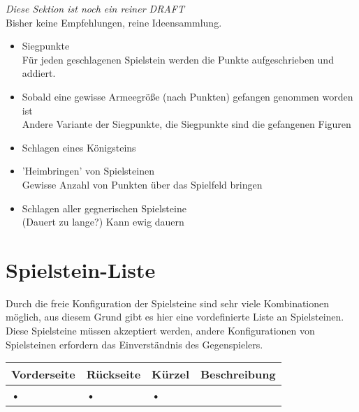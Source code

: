 \documentclass{article}
\begin{document}
	\textit{Diese Sektion ist noch ein reiner DRAFT} \\
	Bisher keine Empfehlungen, reine Ideensammlung.
	
	\begin{itemize}
	\item Siegpunkte \\
		  Für jeden geschlagenen Spielstein werden die Punkte aufgeschrieben und addiert.

	
	\item Sobald eine gewisse Armeegröße (nach Punkten) gefangen genommen worden ist \\
		  Andere Variante der Siegpunkte, die Siegpunkte sind die gefangenen Figuren
	
	\item Schlagen eines Königsteins
	
	\item 'Heimbringen' von Spielsteinen \\
	       Gewisse Anzahl von Punkten über das Spielfeld bringen
	
	\item Schlagen aller gegnerischen Spielsteine \\
	      (Dauert zu lange?) Kann ewig dauern	
	\end{itemize}
	


\section{Spielstein-Liste}
	
	Durch die freie Konfiguration der Spielsteine sind sehr viele Kombinationen möglich, 
	aus diesem Grund gibt es hier eine vordefinierte Liste an Spielsteinen. Diese Spielsteine
	müssen akzeptiert werden, andere Konfigurationen von Spielsteinen erfordern das Einverständnis
	des Gegenspielers.
	
	\begin{tabular}{llll}
	\hline
	Vorderseite & Rückseite & Kürzel & Beschreibung \\ \hline
	• & • & • \\ 
	\hline
	\end{tabular} 
\end{document}
